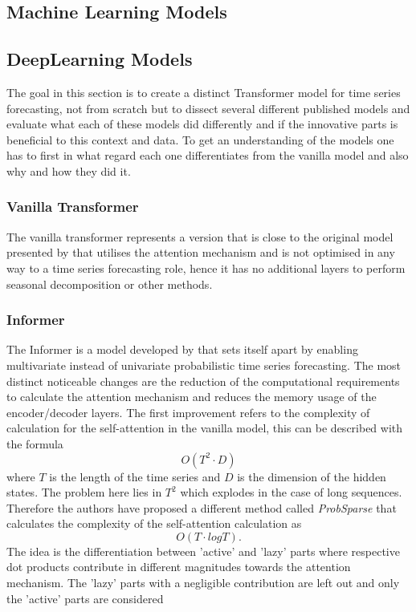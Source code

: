 \documentclass{article}
\begin{document}
\subsection{Machine Learning Models}


\subsection{DeepLearning Models}

The goal in this section is to create a distinct Transformer model for time series forecasting, not from scratch but to dissect several different published models and evaluate what each of these models did differently and if the innovative parts is beneficial to this context and data. To get an understanding of the models one has to first in what regard each one differentiates from the vanilla model and also why and how they did it.

\subsubsection{Vanilla Transformer}

The vanilla transformer represents a version that is close to the original model presented by \cite{vanilla-transformer} that utilises the attention mechanism and is not optimised in any way to a time series forecasting role, hence it has no additional layers to perform seasonal decomposition or other methods.

\subsubsection{Informer}

The Informer is a model developed by \cite{Informer} that sets itself apart by enabling multivariate instead of univariate probabilistic time series forecasting. The most distinct noticeable changes are the reduction of the computational requirements to calculate the attention mechanism and reduces the memory usage of the encoder/decoder layers. The first improvement refers to the complexity of calculation for the self-attention in the vanilla model, this can be described with the formula
\begin{equation*}
    O(T^2 \cdot D)
\end{equation*}
where $T$ is the length of the time series and $D$ is the dimension of the hidden states. The problem here lies in $T^2$ which explodes in the case of long sequences. Therefore the authors have proposed a different method called \textit{ProbSparse} that calculates the complexity of the self-attention calculation as
\begin{equation*}
    O(T \cdot log{T}) .
\end{equation*}
The idea is the differentiation between 'active' and 'lazy' parts where respective dot products contribute in different magnitudes towards the attention mechanism. The 'lazy' parts with a negligible contribution are left out and only the 'active' parts are considered
\end{document}
